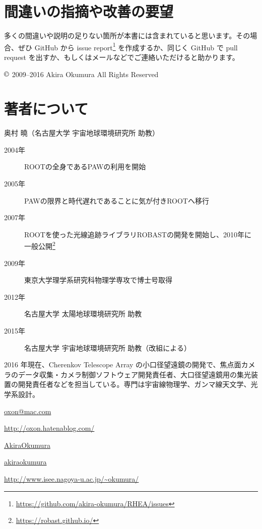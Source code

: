 \documentclass[oneside]{jsbook}
\makeatletter
\def\@listoflistenv{[NoFloat][listings][lstlisting]}
\newif\if@expire@floats \@expire@floatsfalse
\def\begin#1{%
   \@ifundefined{#1}%
      {\def\reserved@a{\@latex@error{Environment #1 undefined}\@eha}}%
      {\def\reserved@a{\def\@currenvir{#1}%
          \edef\@currenvline{\on@line}%
          \@check@listenv
          \csname #1\endcsname}}%
       \@ignorefalse
   \begingroup\@endpefalse\reserved@a}
\def\@check@listenv{%
   \@expandtwoargs\in@{[\@currenvir]}{\@listoflistenv}%
   \ifin@ \@expire@floatstrue \fi}
\makeatother
\begin{document}
\section*{間違いの指摘や改善の要望}
多くの間違いや説明の足りない箇所が本書には含まれていると思います。その場合、ぜひ GitHub から issue report\footnote{\url{https://github.com/akira-okumura/RHEA/issues}} を作成するか、同じく GitHub で pull request を出すか、もしくはメールなどでご連絡いただけると助かります。

\begin{flushright}
$\copyright$ 2009--2016 Akira Okumura All Rights Reserved
\end{flushright}

\pagebreak

\section*{著者について}
{\large 奥村 曉（名古屋大学 宇宙地球環境研究所 助教）}
         
\begin{description}
  \item[\quad2004年]ROOTの全身であるPAWの利用を開始
  \item[\quad2005年]PAWの限界と時代遅れであることに気が付きROOTへ移行
  \item[\quad2007年]ROOTを使った光線追跡ライブラリROBASTの開発を開始し、2010年に一般公開\footnote{\url{https://robast.github.io/}}
  \item[\quad2009年]東京大学理学系研究科物理学専攻で博士号取得
  \item[\quad2012年]名古屋大学 太陽地球環境研究所 助教
  \item[\quad2015年]名古屋大学 宇宙地球環境研究所 助教（改組による）
\end{description}

2016 年現在、Cherenkov Telescope Array の小口径望遠鏡の開発で、焦点面カメラのデータ収集・カメラ制御ソフトウェア開発責任者、大口径望遠鏡用の集光装置の開発責任者などを担当している。専門は宇宙線物理学、ガンマ線天文学、光学系設計。

\begin{description}[labelwidth=2.cm]
  \item[\quad 電子メール]\url{oxon@mac.com}
  \item[\quad blog]\url{http://oxon.hatenablog.com/}
  \item[\quad Twitter]\href{https://twitter.com/AkiraOkumura}{AkiraOkumura}
  \item[\quad Flickr]\href{https://www.flickr.com/photos/akiraokumura/}{akiraokumura}
  \item[\quad 個人ページ]\url{http://www.isee.nagoya-u.ac.jp/~okumura/}
\end{description}

\tableofcontents
\mainmatter











\end{document}
